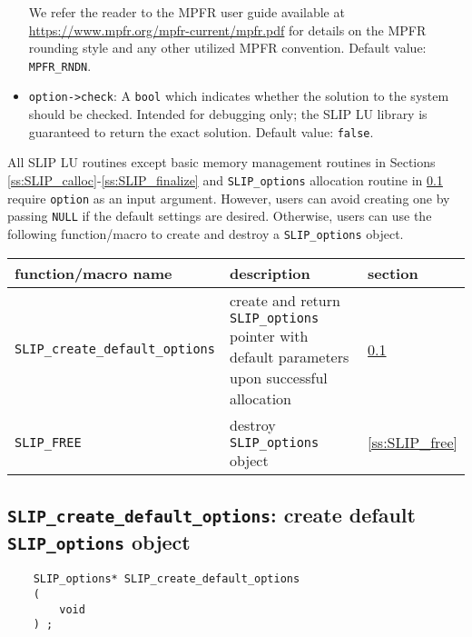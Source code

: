 \documentclass[12pt]{article}
\theoremstyle{definition}
\begin{document}
\begin{itemize}
\noindent We refer the reader to the MPFR user guide available at
\url{https://www.mpfr.org/mpfr-current/mpfr.pdf} for details on the MPFR
rounding style and any other utilized MPFR convention. Default value:
\verb|MPFR_RNDN|.

\item
\verb|option->check|: A \verb|bool| which indicates whether the solution to the
system should be checked. Intended for debugging only; the SLIP LU library is
guaranteed to return the exact solution. Default value: \verb|false|.

\end{itemize}

All SLIP LU routines except basic memory management routines in Sections
\ref{ss:SLIP_calloc}-\ref{ss:SLIP_finalize} and \verb|SLIP_options| allocation
routine in \ref{ss:create_default_options} require \verb|option| as an input
argument. However, users can avoid creating one by passing \verb|NULL| if the
default settings are desired.  Otherwise, users can use the following
function/macro to create and destroy a \verb|SLIP_options| object.

\begin{center}
\begin{tabular}{lp{2.5in}l}
\hline
function/macro name & description & section \\
\hline
\verb|SLIP_create_default_options|
    & create and return \verb|SLIP_options| pointer
      with default parameters upon successful allocation
    & \ref{ss:create_default_options} \\
\hline
\verb|SLIP_FREE|
    & destroy \verb|SLIP_options| object
    & \ref{ss:SLIP_free} \\
\hline
\end{tabular}
\end{center}

\cprotect\subsection{\verb|SLIP_create_default_options|: create default \verb|SLIP_options| object}
\label{ss:create_default_options}

\begin{mdframed}[userdefinedwidth=6in]
{\footnotesize
\begin{verbatim}
    SLIP_options* SLIP_create_default_options
    (
        void
    ) ;
\end{verbatim}
} \end{mdframed}
\end{document}
